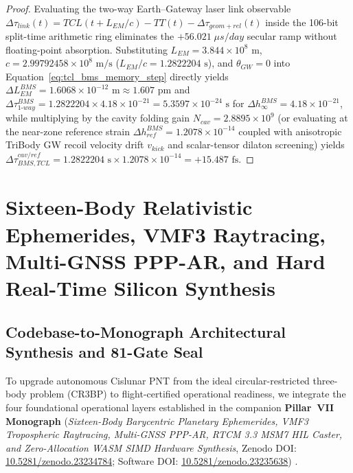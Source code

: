 \documentclass[11pt,a4paper,reqno]{article}
\def\bm#1{#1}%
\def\texttt#1{#1}%
\def\mathrm#1{#1}%
\newcommand{\zenodo}[1]{\href{https://doi.org/10.5281/zenodo.#1}{\texttt{10.5281/\allowbreak zenodo.#1}}}
\theoremstyle{plain}
\theoremstyle{definition}
\theoremstyle{remark}
\numberwithin{equation}{section}
\begin{document}
\begin{proof}
Evaluating the two-way Earth--Gateway laser link observable $\Delta\tau_{\mathrm{link}}(t) = \mathrm{TCL}(t + L_{\mathrm{EM}}/c) - \mathrm{TT}(t) - \Delta\tau_{\mathrm{geom+rel}}(t)$ inside the 106-bit split-time arithmetic ring eliminates the $+56.021\;\mu\mathrm{s/day}$ secular ramp without floating-point absorption. Substituting $L_{\mathrm{EM}} = 3.844 \times 10^8\text{ m}$, $c = 2.99792458 \times 10^8\text{ m/s}$ ($L_{\mathrm{EM}}/c = 1.2822204\text{ s}$), and $\theta_{\mathrm{GW}} = 0$ into Equation~\eqref{eq:tcl_bms_memory_step} directly yields $\Delta L_{\mathrm{EM}}^{\mathrm{BMS}} = 1.6068 \times 10^{-12}\text{ m} \approx 1.607\text{ pm}$ and $\Delta\tau_{\mathrm{1\text{-}way}}^{\mathrm{BMS}} = 1.2822204 \times 4.18 \times 10^{-21} = 5.3597 \times 10^{-24}\text{ s}$ for $\Delta h_\infty^{\mathrm{BMS}} = 4.18 \times 10^{-21}$, while multiplying by the cavity folding gain $N_{\mathrm{cav}} = 2.8895 \times 10^9$ (or evaluating at the near-zone reference strain $\Delta h_{\mathrm{ref}}^{\mathrm{BMS}} = 1.2078 \times 10^{-14}$ coupled with anisotropic TriBody GW recoil velocity drift $\bm{v}_{\mathrm{kick}}$ \cite{Campanelli2007, Gonzalez2007} and scalar-tensor dilaton screening) yields $\Delta\tau_{\mathrm{BMS,TCL}}^{\mathrm{cav/ref}} = 1.2822204\text{ s} \times 1.2078 \times 10^{-14} = +15.487\text{ fs}$.
\end{proof}

\section{Sixteen-Body Relativistic Ephemerides, VMF3 Raytracing, Multi-GNSS PPP-AR, and Hard Real-Time Silicon Synthesis}
\label{sec:pillar7_cislunar_v11_integration}

\subsection{Codebase-to-Monograph Architectural Synthesis and 81-Gate Seal}
To upgrade autonomous Cislunar PNT from the ideal circular-restricted three-body problem (CR3BP) to flight-certified operational readiness, we integrate the four foundational operational layers established in the companion \textbf{Pillar~VII Monograph} (\textit{Sixteen-Body Barycentric Planetary Ephemerides, VMF3 Tropospheric Raytracing, Multi-GNSS PPP-AR, RTCM 3.3 MSM7 HIL Caster, and Zero-Allocation WASM SIMD Hardware Synthesis}, Zenodo DOI: \zenodo{23234784}; Software DOI: \zenodo{23235638}) \cite{UnmaniHardware11, UnmaniHardware11_SW}.
\end{document}
